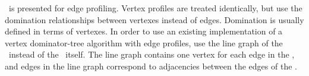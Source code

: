 \HN\ is presented for edge profiling.  Vertex profiles are treated
identically, but use the domination relationships between vertexes
instead of edges.  Domination is usually defined in terms of vertexes.
In order to use an existing implementation of a vertex dominator-tree
algorithm with edge profiles, use the line graph of the \CFG\ instead of
the \CFG\ itself.  The line graph contains one vertex for each edge in
the \CFG, and edges in the line graph correspond to adjacencies
between the edges of the \CFG.



